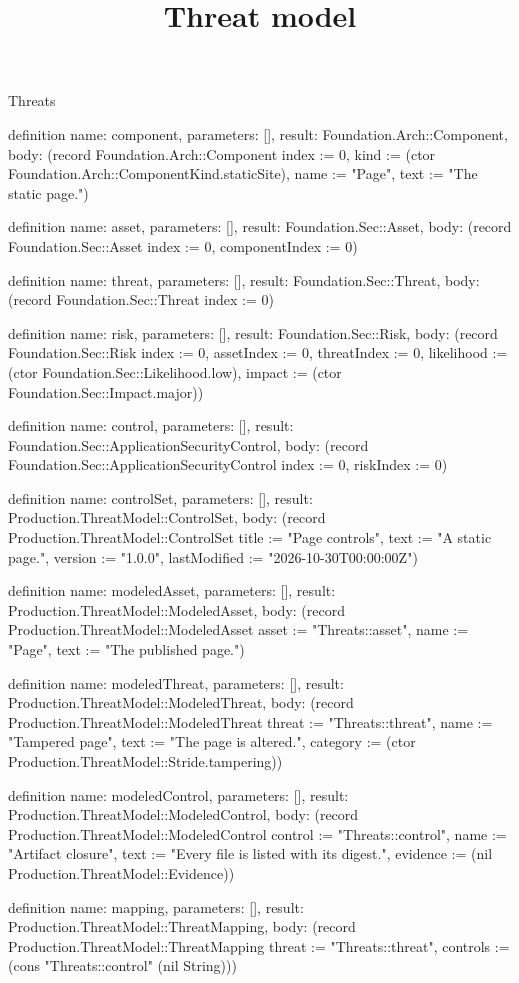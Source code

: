 \begin{lexlean}{Threats}
\title{Threat model}
\begin{semanticmodule}
definition{
  name: component,
  parameters: [],
  result: Foundation.Arch::Component,
  body: (record Foundation.Arch::Component {index := 0, kind := (ctor Foundation.Arch::ComponentKind.staticSite), name := "Page", text := "The static page."})
}

definition{
  name: asset,
  parameters: [],
  result: Foundation.Sec::Asset,
  body: (record Foundation.Sec::Asset {index := 0, componentIndex := 0})
}

definition{
  name: threat,
  parameters: [],
  result: Foundation.Sec::Threat,
  body: (record Foundation.Sec::Threat {index := 0})
}

definition{
  name: risk,
  parameters: [],
  result: Foundation.Sec::Risk,
  body: (record Foundation.Sec::Risk {index := 0, assetIndex := 0, threatIndex := 0, likelihood := (ctor Foundation.Sec::Likelihood.low), impact := (ctor Foundation.Sec::Impact.major)})
}

definition{
  name: control,
  parameters: [],
  result: Foundation.Sec::ApplicationSecurityControl,
  body: (record Foundation.Sec::ApplicationSecurityControl {index := 0, riskIndex := 0})
}

definition{
  name: controlSet,
  parameters: [],
  result: Production.ThreatModel::ControlSet,
  body: (record Production.ThreatModel::ControlSet {title := "Page controls", text := "A static page.", version := "1.0.0", lastModified := "2026-10-30T00:00:00Z"})
}

definition{
  name: modeledAsset,
  parameters: [],
  result: Production.ThreatModel::ModeledAsset,
  body: (record Production.ThreatModel::ModeledAsset {asset := "Threats::asset", name := "Page", text := "The published page."})
}

definition{
  name: modeledThreat,
  parameters: [],
  result: Production.ThreatModel::ModeledThreat,
  body: (record Production.ThreatModel::ModeledThreat {threat := "Threats::threat", name := "Tampered page", text := "The page is altered.", category := (ctor Production.ThreatModel::Stride.tampering)})
}

definition{
  name: modeledControl,
  parameters: [],
  result: Production.ThreatModel::ModeledControl,
  body: (record Production.ThreatModel::ModeledControl {control := "Threats::control", name := "Artifact closure", text := "Every file is listed with its digest.", evidence := (nil Production.ThreatModel::Evidence)})
}

definition{
  name: mapping,
  parameters: [],
  result: Production.ThreatModel::ThreatMapping,
  body: (record Production.ThreatModel::ThreatMapping {threat := "Threats::threat", controls := (cons "Threats::control" (nil String))})
}
\end{semanticmodule}
\end{lexlean}
